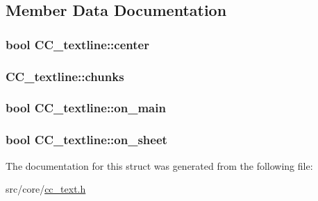 \subsection{Member Data Documentation}
\hypertarget{a00048_aa30f5aaa1f04fe8bc24716b13031332e}{
\subsubsection[{center}]{\setlength{\rightskip}{0pt plus 5cm}bool C\-C\-\_\-textline\-::center}}\label{a00048_aa30f5aaa1f04fe8bc24716b13031332e}
\hypertarget{a00048_aa3ee52cf984e66f697707a5a7a7e1c3d}{
\subsubsection[{chunks}]{ C\-C\-\_\-textline\-::chunks}}\label{a00048_aa3ee52cf984e66f697707a5a7a7e1c3d}
\hypertarget{a00048_a4be31d564aa2502c59a12ed06beec1c2}{
\subsubsection[{on\-\_\-main}]{\setlength{\rightskip}{0pt plus 5cm}bool C\-C\-\_\-textline\-::on\-\_\-main}}\label{a00048_a4be31d564aa2502c59a12ed06beec1c2}
\hypertarget{a00048_ab87ae0231a13cb108a4c9e6b54a2401e}{
\subsubsection[{on\-\_\-sheet}]{\setlength{\rightskip}{0pt plus 5cm}bool C\-C\-\_\-textline\-::on\-\_\-sheet}}\label{a00048_ab87ae0231a13cb108a4c9e6b54a2401e}


The documentation for this struct was generated from the following file\-:\begin{DoxyCompactItemize}
\item 
src/core/\hyperlink{a00215}{cc\-\_\-text.\-h}\end{DoxyCompactItemize}
